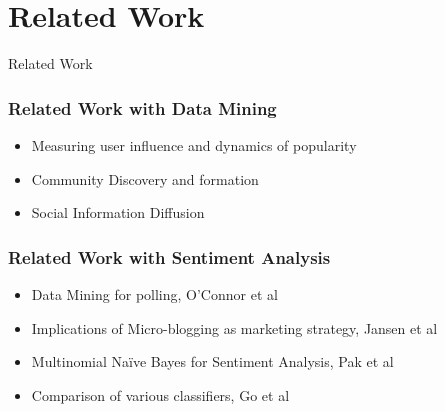 \section{Related Work}

\begin{frame}
        \centering
        \huge Related Work
\end{frame}

\begin{frame}
	\frametitle{Related Work with Data Mining}
	\begin{itemize}
		\item Measuring user influence and dynamics of popularity
		\item Community Discovery and formation
		\item Social Information Diffusion
	\end{itemize}
\end{frame}

\begin{frame}
\frametitle{Related Work with Sentiment Analysis}
\begin{itemize}
	\item Data Mining for polling, O'Connor et al
	\item Implications of Micro-blogging as marketing strategy, Jansen et al
	\item Multinomial Naïve Bayes for Sentiment Analysis, Pak et al
	\item Comparison of various classifiers, Go et al
\end{itemize}
\end{frame}